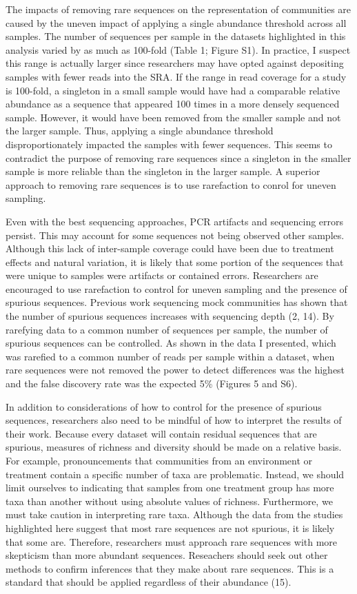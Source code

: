 \documentclass[
]{article}
\begin{document}
The impacts of removing rare sequences on the representation of
communities are caused by the uneven impact of applying a single
abundance threshold across all samples. The number of sequences per
sample in the datasets highlighted in this analysis varied by as much as
100-fold (Table 1; Figure S1). In practice, I suspect this range is
actually larger since researchers may have opted against depositing
samples with fewer reads into the SRA. If the range in read coverage for
a study is 100-fold, a singleton in a small sample would have had a
comparable relative abundance as a sequence that appeared 100 times in a
more densely sequenced sample. However, it would have been removed from
the smaller sample and not the larger sample. Thus, applying a single
abundance threshold disproportionately impacted the samples with fewer
sequences. This seems to contradict the purpose of removing rare
sequences since a singleton in the smaller sample is more reliable than
the singleton in the larger sample. A superior approach to removing rare
sequences is to use rarefaction to conrol for uneven sampling.

Even with the best sequencing approaches, PCR artifacts and sequencing
errors persist. This may account for some sequences not being observed
other samples. Although this lack of inter-sample coverage could have
been due to treatment effects and natural variation, it is likely that
some portion of the sequences that were unique to samples were artifacts
or contained errors. Researchers are encouraged to use rarefaction to
control for uneven sampling and the presence of spurious sequences.
Previous work sequencing mock communities has shown that the number of
spurious sequences increases with sequencing depth (2, 14). By rarefying
data to a common number of sequences per sample, the number of spurious
sequences can be controlled. As shown in the data I presented, which was
rarefied to a common number of reads per sample within a dataset, when
rare sequences were not removed the power to detect differences was the
highest and the false discovery rate was the expected 5\% (Figures 5 and
S6).

In addition to considerations of how to control for the presence of
spurious sequences, researchers also need to be mindful of how to
interpret the results of their work. Because every dataset will contain
residual sequences that are spurious, measures of richness and diversity
should be made on a relative basis. For example, pronouncements that
communities from an environment or treatment contain a specific number
of taxa are problematic. Instead, we should limit ourselves to
indicating that samples from one treatment group has more taxa than
another without using absolute values of richness. Furthermore, we must
take caution in interpreting rare taxa. Although the data from the
studies highlighted here suggest that most rare sequences are not
spurious, it is likely that some are. Therefore, researchers must
approach rare sequences with more skepticism than more abundant
sequences. Reseachers should seek out other methods to confirm
inferences that they make about rare sequences. This is a standard that
should be applied regardless of their abundance (15).
\end{document}

